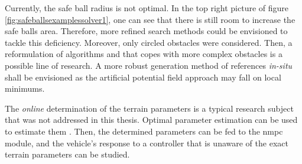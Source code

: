 Currently, the safe ball radius is not optimal. In the top right picture of figure \ref{fig:safeballsexamplessolver1}, one can see that there is still room to increase the safe balls area. Therefore, more refined search methods could be envisioned to tackle this deficiency. Moreover, only circled obstacles were considered. Then, a reformulation of algorithms  and  that copes with more complex obstacles is a possible line of research. A more robust generation method of references \textit{in-situ} shall be envisioned as the artificial potential field approach may fall on local minimums.

The \textit{online} determination of the terrain parameters is a typical research subject that was not addressed in this thesis. Optimal parameter estimation can be used to estimate them \cite{diehlnumericalocp}. Then, the determined parameters can be fed to the \acrshort{nmpc} module, and the vehicle's response to a controller that is unaware of the exact terrain parameters can be studied.